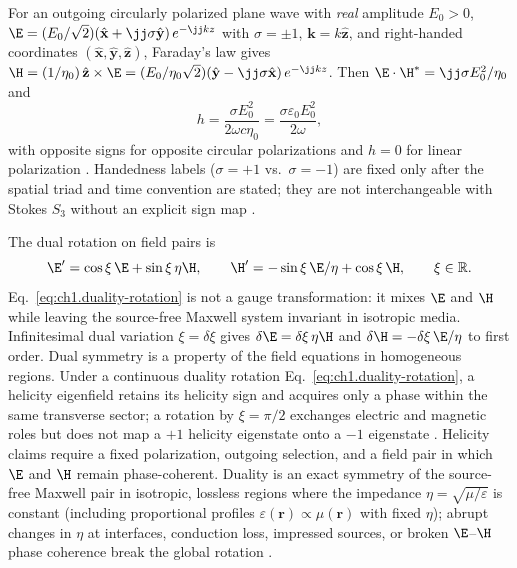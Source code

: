 For an outgoing circularly polarized plane wave with \emph{real} amplitude $E_0>0$,
\(\E=(E_0/\sqrt{2})(\hat{\mathbf{x}}+\jj\sigma\hat{\mathbf{y}})\,e^{-\jj kz}\) with
\(\sigma=\pm1\), \(\mathbf{k}=k\hat{\mathbf{z}}\), and right-handed coordinates
\((\hat{\mathbf{x}},\hat{\mathbf{y}},\hat{\mathbf{z}})\), Faraday's law gives
\(\H=(1/\eta_0)\,\hat{\mathbf{z}}\times\E
=(E_0/\eta_0\sqrt{2})(\hat{\mathbf{y}}-\jj\sigma\hat{\mathbf{x}})\,e^{-\jj kz}\).
Then \(\E\cdot\H^*=\jj\sigma E_0^2/\eta_0\) and
\begin{equation}
\label{eq:ch1.helicity-plane-wave}
h=\frac{\sigma E_0^2}{2\omega c\eta_0}
=\frac{\sigma\varepsilon_0 E_0^2}{2\omega},
\end{equation}
with opposite signs for opposite circular polarizations and $h=0$ for linear polarization
\cite{stratton1941,belinfante1940}. Handedness labels ($\sigma=+1$ vs.\ $\sigma=-1$) are fixed
only after the spatial triad and time convention are stated; they are not interchangeable
with Stokes $S_3$ without an explicit sign map \cite{stratton1941}.

The dual rotation on field pairs is
\begin{equation}
\label{eq:ch1.duality-rotation}
\E'=\cos\xi\,\E+\sin\xi\,\eta\H,\qquad
\H'=-\sin\xi\,\E/\eta+\cos\xi\,\H,\qquad \xi\in\mathbb{R}.
\end{equation}
Eq.~\eqref{eq:ch1.duality-rotation} is not a gauge transformation: it
mixes \(\E\) and \(\H\) while leaving the source-free Maxwell system invariant in
isotropic media. Infinitesimal dual variation \(\xi=\delta\xi\) gives
\(\delta\E=\delta\xi\,\eta\H\) and \(\delta\H=-\delta\xi\,\E/\eta\) to first order.
Dual symmetry is a property of the field equations in homogeneous regions. Under a continuous
duality rotation Eq.~\eqref{eq:ch1.duality-rotation}, a helicity eigenfield retains its
helicity sign and acquires only a phase within the same transverse sector; a rotation by
\(\xi=\pi/2\) exchanges electric and magnetic roles but does not map a \(+1\) helicity
eigenstate onto a \(-1\) eigenstate \cite{stratton1941}. Helicity claims require a fixed
polarization, outgoing selection, and a field pair in which \(\E\) and \(\H\) remain
phase-coherent. Duality is an exact symmetry of the source-free Maxwell pair in isotropic, lossless regions where the impedance \(\eta=\sqrt{\mu/\varepsilon}\) is constant (including proportional profiles \(\varepsilon(\mathbf r)\propto\mu(\mathbf r)\) with fixed \(\eta\)); abrupt changes in \(\eta\) at interfaces, conduction loss, impressed sources, or broken \(\E\)--\(\H\) phase coherence break the global rotation \cite{stratton1941,fernandezcorbaton2013}.

